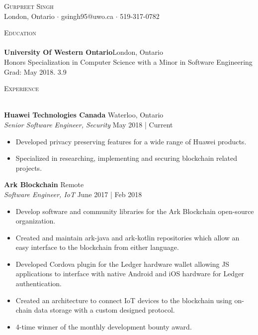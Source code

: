 \documentclass[a4paper]{article}
\newcommand{\lineunder} {
    \vspace*{-8pt} \\
    \hspace*{-18pt} \hrulefill \\
}
\newcommand{\header} [1] {
    {\hspace*{-18pt}\vspace*{6pt} \textsc{#1}}
    \vspace*{-6pt} \lineunder
}
\begin{document}
\vspace*{-40pt}

\vspace*{-10pt}
\begin{center}
	{\Huge \scshape {Gurpreet Singh}}\\
	London, Ontario $\cdot$ gsingh95@uwo.ca $\cdot$ 519-317-0782
\end{center}

\vspace*{2mm}

\header{Education}
\textbf{University Of Western Ontario}\hfill London, Ontario\\
Honors Specialization in Computer Science with a Minor in Software Engineering \hfill Grad: May 2018. 3.9\\ 
\vspace{2mm}

\vspace*{2mm}

\header{Experience}
\vspace{1mm}

\textbf{Huawei Technologies Canada} \hfill Waterloo, Ontario\\
\textit{Senior Software Engineer, Security} \hfill May 2018 | Current\\
\vspace{-1mm}
\begin{itemize} \itemsep 1pt
	\item Developed privacy preserving features for a wide range of Huawei products.
	\item Specialized in researching, implementing and securing blockchain related projects.
\end{itemize}

\textbf{Ark Blockchain} \hfill Remote\\
\textit{Software Engineer, IoT} \hfill June 2017 | Feb 2018\\
\vspace{-1mm}
\begin{itemize} \itemsep 1pt
	\item Develop software and community libraries for the Ark Blockchain open-source organization.
	\item Created and maintain ark-java and ark-kotlin repositories which allow an easy interface to the blockchain from either language.
    \item Developed Cordova plugin for the Ledger hardware wallet allowing JS applications to interface with native Android and iOS hardware for Ledger authentication.
    \item Created an architecture to connect IoT devices to the blockchain using on-chain data storage with a custom designed protocol.\\
    \item 4-time winner of the monthly development bounty award.
\end{itemize}
\end{document}
